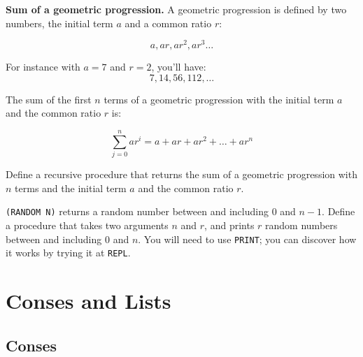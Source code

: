 \documentclass[a4paper,11pt]{article}
\begin{document}
\begin{uexercise}

{\bf Sum of a geometric progression.} A geometric progression is defined by two numbers, the initial term $a$ and a common ratio $r$:  

	$$
	a, ar, ar^2, ar^3\ldots	
		$$	

		For instance with $a=7$ and $r=2$, you'll have: 
	$$
		7, 14, 56, 112,\ldots 	
		$$	
	
		The sum of the first $n$ terms of a geometric progression with the initial term $a$ and the common ratio $r$ is:


$$
		\sum_{j=0}^{n} ar^i = a + ar + ar^2 + \ldots + ar^n
		$$


Define a recursive procedure that returns the sum of a geometric progression with $n$ terms and the initial term $a$ and the common ratio $r$.

\end{uexercise}

\begin{uexercise}
\Verb+(RANDOM N)+ returns a random number between and including $0$ and $n-1$. Define a procedure that takes two arguments $n$ and $r$, and prints $r$ random numbers between and including $0$ and $n$. You will need to use \Verb+PRINT+; you can discover how it works by trying it at \Verb+REPL+.


\end{uexercise}

\noindent\hrulefill

\newpage

\section{Conses and Lists}

\subsection{Conses}
\end{document}
